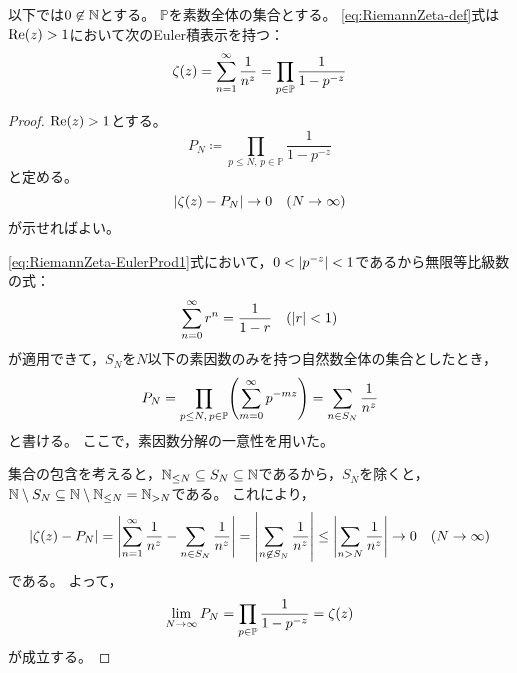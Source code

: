 \documentclass[a4paper,draft]{ltjsarticle}
\begin{document}
\begin{thm}
    以下では$0\not\in \mathbb{N}$とする。
    $\mathbb{P}$を素数全体の集合とする。
    \eqref{eq:RiemannZeta-def}式は$\re{z}>1$において次のEuler積表示を持つ：
    \begin{equation}
        \fun{\zeta}{z} = \sum_{n=1}^\infty \frac{1}{n^z} = \prod_{p\in \mathbb{P}}\frac{1}{1-p^{-z}}
    \end{equation}

    \begin{proof}
        $\re{z}>1$とする。
        \begin{equation}
            P_N\coloneqq \prod_{p\leq N,\, p\in\mathbb{P}} \frac{1}{1-p^{-z}}
            \label{eq:RiemannZeta-EulerProd1}
        \end{equation}
        と定める。
        \begin{equation}
            \abs{\fun{\zeta}{z}-P_N}\to 0\quad\pare{N\to\infty}
        \end{equation}
        が示せればよい。

        \eqref{eq:RiemannZeta-EulerProd1}式において，$0<\abs{p^{-z}}<1$であるから無限等比級数の式：
        \begin{equation}
            \sum_{n=0}^\infty r^n=\frac{1}{1-r}\quad\pare{\abs{r}<1}
        \end{equation}
        が適用できて，$S_N$を$N$以下の素因数のみを持つ自然数全体の集合としたとき，
        \begin{equation}
            P_N = \prod_{p\leq N,\, p\in\mathbb{P}}\pare{\sum_{m=0}^\infty p^{-mz}}=\sum_{n\in S_N} \frac{1}{n^z}
        \end{equation}
        と書ける。
        ここで，素因数分解の一意性を用いた。

        集合の包含を考えると，$\mathbb{N}_{\leq N}\subseteq S_N\subseteq \mathbb{N}$であるから，$S_N$を除くと，$\mathbb{N}\setminus S_N \subseteq \mathbb{N}\setminus \mathbb{N}_{\leq N}=\mathbb{N}_{>N}$である。
        これにより，
        \begin{equation}
            \abs{\fun{\zeta}{z}-P_N}=\abs{\sum_{n=1}^\infty \frac{1}{n^z}-\sum_{n\in S_N}\frac{1}{n^z}}
            =\abs{\sum_{n\not\in S_N}\frac{1}{n^z}}\leq \abs{\sum_{n>N}\frac{1}{n^z}}\to 0 \quad\pare{N\to\infty}
        \end{equation}
        である。
        よって，
        \begin{equation}
            \lim_{N\to\infty}P_N = \prod_{p\in \mathbb{P}}\frac{1}{1-p^{-z}}=\fun{\zeta}{z}
        \end{equation}
        が成立する。
    \end{proof}
\end{thm}
\end{document}
